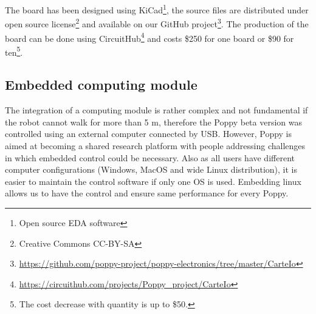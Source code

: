 The board has been designed using KiCad\footnote{Open source EDA software}, the source files are distributed under open source license\footnote{Creative Commons CC-BY-SA} and available on our GitHub project\footnote{\url{https://github.com/poppy-project/poppy-electronics/tree/master/CarteIo}}. The production of the board can be done using CircuitHub\footnote{\url{https://circuithub.com/projects/Poppy_project/CarteIo}} and costs \$250 for one board or \$90 for ten\footnote{The cost decrease with quantity is up to \$50.}.

\begin{figure}[p]
\centering


    \caption{}
    \label{fig:IO-board}
\end{figure}


\subsection{Embedded computing module} %

The integration of a computing module is rather complex and not fundamental if the robot cannot walk for more than 5 m, therefore the Poppy beta version was controlled using an external computer connected by USB.
However, Poppy is aimed at becoming a shared research platform with people addressing challenges in which embedded control could be necessary. Also as all users have different computer configurations (Windows, MacOS and wide Linux distribution), it is easier to maintain the control software if only one OS is used. Embedding linux allows us to have the control and ensure same performance for every Poppy.

